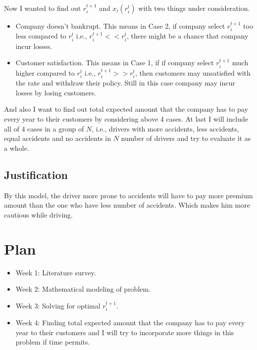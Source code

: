\documentclass[a4paper,english,12pt]{article}
\begin{document}
Now I wanted to find out $r_i^{t+1}$ and $x_i(r_i^t)$ with two things under consideration.
\begin{itemize}
\item Company doesn't bankrupt. This means in Case 2, if company select $r_i^{t+1}$ too less compared to $r_i^t$ i.e., $r_i^{t+1} << r_i^t $, there might be a chance that company incur losses.
\item Customer satisfaction. This means in Case 1, if if company select $r_i^{t+1}$ much higher compared to $r_i^t$ i.e., $r_i^{t+1} >> r_i^t $, then customers may unsatisfied with the rate and withdraw their policy. Still in this case company may incur losses by losing customers.
\end{itemize}
And also I want to find out total expected amount that the company has to pay every year to their customers by considering above 4 cases. At last I will include all of 4 cases in  a group of $N$, i.e., drivers with more accidents, less accidents, equal accidents and no accidents in $N$ number of drivers and try to evaluate it as a whole.  

\subsection{Justification}
By this model, the driver more prone to accidents will have to pay more premium amount than the one who have less number of accidents. Which makes him more cautious while driving.
\section{Plan}
\begin{itemize}
\item Week 1: Literature survey.
\item Week 2: Mathematical modeling of problem.
\item Week 3: Solving for optimal $r_i^{t+1}$.
\item Week 4: Finding total expected amount that the company has to pay every year to their customers and I will try to incorporate more things in this problem if time permits.
\end{itemize}
\end{document}
